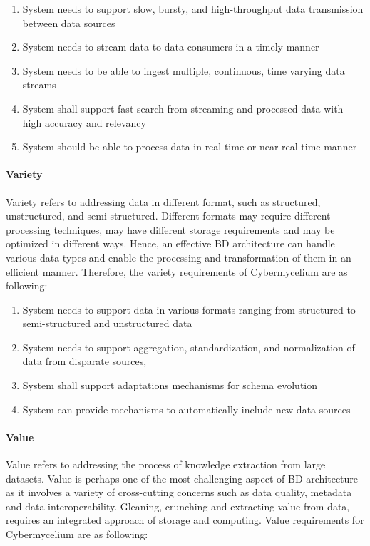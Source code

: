 \documentclass{bmcart}
\begin{document}
\begin{enumerate}[label=\textbf{Vel-\arabic*}]
    \item System needs to support slow, bursty, and high-throughput data transmission between data sources
    \item System needs to stream data to data consumers in a timely manner
    \item System needs to be able to ingest multiple, continuous, time varying data streams
    \item System shall support fast search from streaming and processed data with high accuracy and relevancy
    \item System should be able to process data in real-time or near real-time manner
\end{enumerate}


\paragraph{Variety}

Variety refers to addressing data in different format, such as structured, unstructured, and semi-structured. Different formats may require different processing techniques, may have different storage requirements and may be optimized in different ways. Hence, an effective BD architecture can handle various data types and enable the processing and transformation of them in an efficient manner. Therefore, the variety requirements of Cybermycelium are as following: 

\begin{enumerate}[label=\textbf{Var-\arabic*}]
    \item System needs to support data in various formats ranging from structured to semi-structured and unstructured data
    \item System needs to support aggregation, standardization, and normalization of data from disparate sources,
    \item System shall support adaptations mechanisms for schema evolution
    \item System can provide mechanisms to automatically include new data sources
\end{enumerate}


\paragraph{Value}

Value refers to addressing the process of knowledge extraction from large datasets. Value is perhaps one of the most challenging aspect of BD architecture as it involves a variety of cross-cutting concerns such as data quality, metadata and data interoperability. Gleaning, crunching and extracting value from data, requires an integrated approach of storage and computing. Value requirements for Cybermycelium are as following:
\end{document}
